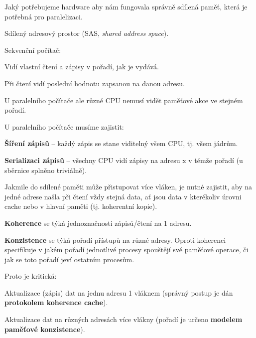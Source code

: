 \begin{compactitem}
    \item Jaký potřebujeme hardware aby nám fungovala správně sdílená paměť, která je potřebná pro paralelizaci.

    \item Sdílený adresový prostor (SAS, \textit{shared address space}).

    \item Sekvenční počítač: \begin{compactitem}
        \item Vidí vlastní čtení a zápisy v pořadí, jak je vydává.
        \item Při čtení vidí poslední hodnotu zapsanou na danou adresu.
        \item U paralelního počítače ale různé CPU nemusí vidět paměťové akce ve stejném pořadí.
    \end{compactitem}

    \item U paralelního počítače musíme zajistit: \begin{compactitem}
        \item \textbf{Šíření zápisů} -- každý zápis se stane viditelný všem CPU, tj. všem jádrům.
        \item \textbf{Serializaci zápisů} -- všechny CPU vidí zápisy na adresu x v témže pořadí (u sběrnice splněno triviálně).
    \end{compactitem}

    \item Jakmile do sdílené paměti může přistupovat více vláken, je nutné zajistit, aby na jedné adrese našla při čtení vždy stejná data, ať jsou data v kterékoliv úrovni cache nebo v hlavní paměti (tj. koherentní kopie). \begin{compactitem}
        \item \textbf{Koherence} se týká jednoznačnosti zápisů/čtení na 1 adresu.

        \item \textbf{Konzistence} se týká pořadí přístupů na různé adresy. Oproti koherenci specifikuje v jakém pořadí jednotlivé procesy spouštějí své paměťové operace, či jak se toto pořadí jeví ostatním procesům.
    \end{compactitem}

    \item Proto je kritická: \begin{compactitem}
        \item Aktualizace (zápis) dat na jednu adresu 1 vláknem (správný postup je dán \textbf{protokolem koherence cache}).

        \item Aktualizace dat na různých adresách více vlákny (pořadí je určeno \textbf{modelem paměťové konzistence}).
    \end{compactitem}
\end{compactitem}

